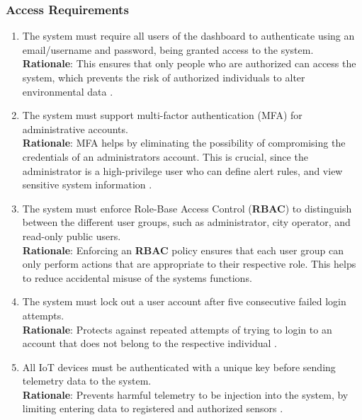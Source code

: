 \documentclass[]{article}
\begin{document}
\subsubsection{Access Requirements}
\label{ssub:access_requirements}
\begin{enumerate}[{SR-AC}1. ]
	\item The system must require all users of the dashboard to authenticate using an email/username and password, being granted access to the system. \\
    \textbf{Rationale}: This ensures that only people who are authorized can access the system, which prevents the risk of authorized individuals to alter environmental data \cite{canUserAuth}.

    \item The system must support multi-factor authentication (MFA) for administrative accounts. \\
    \textbf{Rationale}: MFA helps by eliminating the possibility of compromising the credentials of an administrators account. This is crucial, since the administrator is a high-privilege user who can define alert rules, and view sensitive system information \cite{canSecure}.

    \item The system must enforce Role-Base Access Control (\textbf{RBAC}) to distinguish between the different user groups, such as administrator, city operator, and read-only public users. \\
    \textbf{Rationale}: Enforcing an \textbf{RBAC} policy ensures that each user group can only perform actions that are appropriate to their respective role. This helps to reduce accidental misuse of the systems functions. 

    \item The system must lock out a user account after five consecutive failed login attempts. \\
    \textbf{Rationale}: Protects against repeated attempts of trying to login to an account that does not belong to the respective individual \cite{canUserAuth}.

    \item All IoT devices must be authenticated with a unique key before sending telemetry data to the system. \\
    \textbf{Rationale}: Prevents harmful telemetry to be injection into the system, by limiting entering data to registered and authorized sensors \cite{canIoT}.
\end{enumerate}
\end{document}

